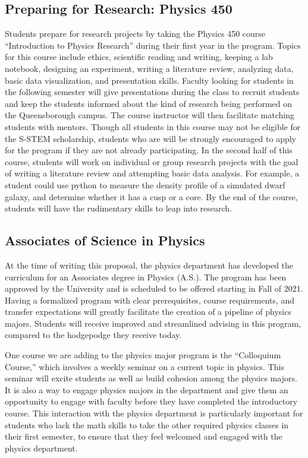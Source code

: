 \documentclass[12pt]{article}
\begin{document}
\subsection{\normalsize{Preparing for Research: Physics 450}}
\vspace{-2mm}
Students prepare for research projects by taking the Physics 450 course ``Introduction to Physics Research'' during their first year in the program.   Topics for this course include ethics, scientific reading and writing, keeping a lab notebook, designing an experiment, writing a literature review, analyzing data, basic data visualization, and presentation skills.  Faculty looking for students in the following semester will give presentations during the class to recruit students and keep the students informed about the kind of research being performed on the Queensborough campus.  The course instructor will then facilitate matching students with mentors.  Though all students in this course may not be eligible for the S-STEM scholarship, students who are will be strongly encouraged to apply for the program if they are not already participating.  In the second half of this course, students will work on individual or group research projects with the goal of writing a literature review and attempting basic data analysis.  For example, a student could use python to measure the density profile of a simulated dwarf galaxy, and determine whether it has a cusp or a core.  By the end of the course, students will have the rudimentary skills to leap into research.  
\vspace{-5mm}

\subsection{\normalsize{Associates of Science in Physics}}
\vspace{-2mm}
 At the time of writing this proposal, the physics department has developed the curriculum for an Associates degree in Physics (A.S.).  The program has been approved by the University and is scheduled to be offered starting in Fall of 2021.  Having a formalized program with clear prerequisites, course requirements, and transfer expectations will greatly facilitate the creation of a pipeline of physics majors.  Students will receive improved and streamlined advising in this program, compared to the hodgepodge they receive today.  

One course we are adding to the physics major program is the ``Colloquium Course,'' which involves a weekly seminar on a current topic in physics.  This seminar will excite students as well as build cohesion among the physics majors.  It is also a way to engage physics majors in the department and give them an opportunity to engage with faculty before they have completed the introductory course.  This interaction with the physics department is particularly important for students who lack the math skills to take the other required physics classes in their first semester, to ensure that they feel welcomed and engaged with the physics department.
\vspace{-5mm}
\end{document}
